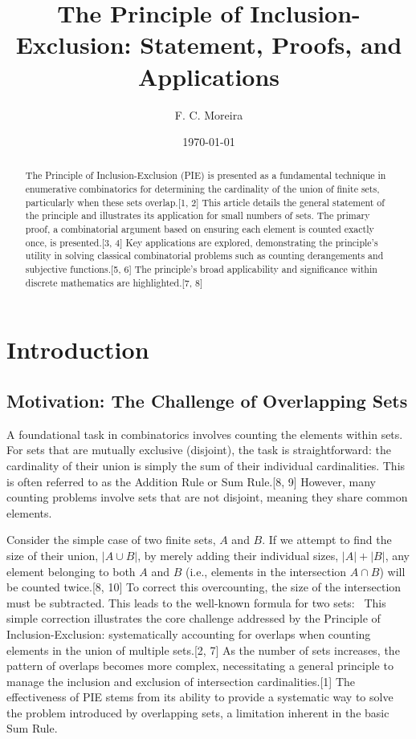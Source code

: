 \documentclass[11pt]{amsart}
\title{The Principle of Inclusion-Exclusion: Statement, Proofs, and Applications}
\author{F. C. Moreira}
\date{\today} %
\theoremstyle{plain}
\theoremstyle{definition}
\theoremstyle{remark}
\begin{document}
\maketitle

\begin{abstract}
The Principle of Inclusion-Exclusion (PIE) is presented as a fundamental technique in enumerative combinatorics for determining the cardinality of the union of finite sets, particularly when these sets overlap.[1, 2] This article details the general statement of the principle and illustrates its application for small numbers of sets. The primary proof, a combinatorial argument based on ensuring each element is counted exactly once, is presented.[3, 4] Key applications are explored, demonstrating the principle's utility in solving classical combinatorial problems such as counting derangements and subjective functions.[5, 6] The principle's broad applicability and significance within discrete mathematics are highlighted.[7, 8]
\end{abstract}

\section{Introduction}

\subsection{Motivation: The Challenge of Overlapping Sets}
A foundational task in combinatorics involves counting the elements within sets. For sets that are mutually exclusive (disjoint), the task is straightforward: the cardinality of their union is simply the sum of their individual cardinalities. This is often referred to as the Addition Rule or Sum Rule.[8, 9] However, many counting problems involve sets that are not disjoint, meaning they share common elements.

Consider the simple case of two finite sets, $A$ and $B$. If we attempt to find the size of their union, $|A \cup B|$, by merely adding their individual sizes, $|A| + |B|$, any element belonging to both $A$ and $B$ (i.e., elements in the intersection $A \cap B$) will be counted twice.[8, 10] To correct this overcounting, the size of the intersection must be subtracted. This leads to the well-known formula for two sets:
\
This simple correction illustrates the core challenge addressed by the Principle of Inclusion-Exclusion: systematically accounting for overlaps when counting elements in the union of multiple sets.[2, 7] As the number of sets increases, the pattern of overlaps becomes more complex, necessitating a general principle to manage the inclusion and exclusion of intersection cardinalities.[1] The effectiveness of PIE stems from its ability to provide a systematic way to solve the problem introduced by overlapping sets, a limitation inherent in the basic Sum Rule.
\end{document}
